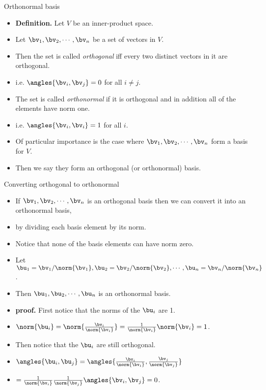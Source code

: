 \documentclass{beamer}
\begin{document}
\begin{frame}{Orthonormal basis}

\begin{itemize}
\item \textbf{Definition.} Let $V$ be an inner-product space.
\item Let $\bv_1,\bv_2,\cdots,\bv_n$ be a set of vectors in $V$.
\item Then the set is called \emph{orthogonal} iff every two distinct vectors in it are orthogonal.
\item i.e. $\angles{\bv_i,\bv_j} = 0$ for all $i\not=j$.
\item The set is called \emph{orthonormal} if it is orthogonal and in addition all of the elements have norm one.
\item i.e. $\angles{\bv_i,\bv_i} = 1$ for all $i$.
\item Of particular importance is the case where $\bv_1,\bv_2,\cdots,\bv_n$  form a basis for $V$.
\item Then we say they form an orthogonal (or orthonormal) basis.
\end{itemize}
\end{frame}

\begin{frame}{Converting orthogonal to orthonormal}

\begin{itemize}
\item If $\bv_1,\bv_2,\cdots,\bv_n$ is an orthogonal basis then we can convert it into an orthonormal basis,
\item by dividing each basis element by its norm.
\item Notice that none of the basis elements can have norm zero.
\item Let $\bu_1 = \bv_1/\norm{\bv_1}, \bu_2=\bv_2/\norm{\bv_2},\cdots,\bu_n=\bv_n/\norm{\bv_n}$.
\item Then $\bu_1,\bu_2,\cdots,\bu_n$ is an orthonormal basis.
\item \textbf{proof.} First notice that the norms of the $\bu_i$ are 1.
\item $\norm{\bu_i} = \norm{\frac{\bv_i}{\norm{\bv_i}}} = \frac{1}{\norm{\bv_i}}\norm{\bv_i} = 1$.
\item Then notice that the $\bu_i$ are still orthogonal.
\item $\angles{\bu_i,\bu_j} = \angles{\frac{\bv_i}{\norm{\bv_i}},\frac{\bv_j}{\norm{\bv_j}}}$
\item $= \frac{1}{\norm{\bv_i}} \frac{1}{\norm{\bv_j}}\angles{\bv_i,\bv_j} = 0$.
\end{itemize}
\end{frame}
\end{document}

